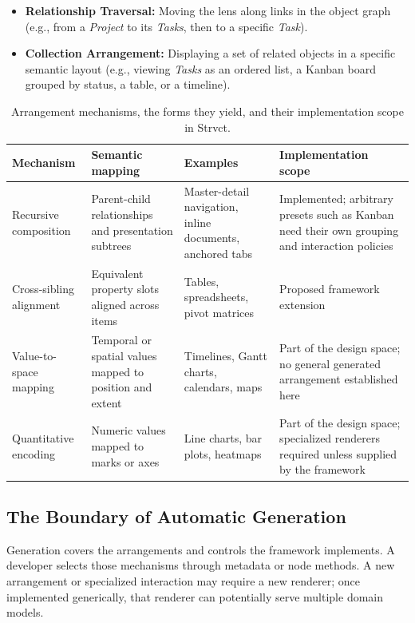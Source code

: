 \documentclass[sigplan,review,anonymous,10pt]{acmart}
\begin{document}
\begin{itemize}
\item \textbf{Relationship Traversal:} Moving the lens along links in the object graph (e.g., from a \emph{Project} to its \emph{Tasks}, then to a specific \emph{Task}).
\item \textbf{Collection Arrangement:} Displaying a set of related objects in a specific semantic layout (e.g., viewing \emph{Tasks} as an ordered list, a Kanban board grouped by status, a table, or a timeline).
\end{itemize}

\begin{table}[t]
\centering
\begin{tabular}{p{} p{} p{} p{}}
\hline
Mechanism & Semantic mapping & Examples & Implementation scope \\
\hline
Recursive composition & Parent-child relationships and presentation subtrees & Master-detail navigation, inline documents, anchored tabs & Implemented; arbitrary presets such as Kanban need their own grouping and interaction policies \\
Cross-sibling alignment & Equivalent property slots aligned across items & Tables, spreadsheets, pivot matrices & Proposed framework extension \\
Value-to-space mapping & Temporal or spatial values mapped to position and extent & Timelines, Gantt charts, calendars, maps & Part of the design space; no general generated arrangement established here \\
Quantitative encoding & Numeric values mapped to marks or axes & Line charts, bar plots, heatmaps & Part of the design space; specialized renderers required unless supplied by the framework \\
\hline
\end{tabular}
\caption{Arrangement mechanisms, the forms they yield, and their implementation scope in Strvct.}
\label{tab:mechanisms}
\end{table}

\subsection{The Boundary of Automatic Generation}
\label{sec:boundary}

Generation covers the arrangements and controls the framework implements. A developer selects those mechanisms through metadata or node methods. A new arrangement or specialized interaction may require a new renderer; once implemented generically, that renderer can potentially serve multiple domain models.
\end{document}
